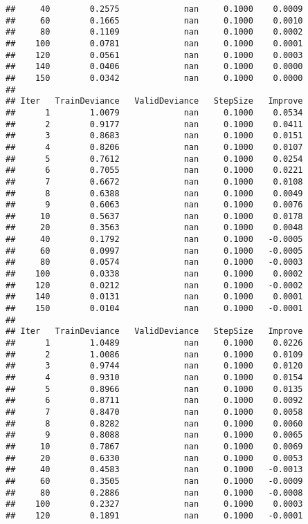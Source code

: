 \documentclass[]{article}
\begin{document}
\begin{verbatim}
##     40        0.2575             nan     0.1000    0.0009
##     60        0.1665             nan     0.1000    0.0010
##     80        0.1109             nan     0.1000    0.0002
##    100        0.0781             nan     0.1000    0.0001
##    120        0.0561             nan     0.1000    0.0003
##    140        0.0406             nan     0.1000    0.0000
##    150        0.0342             nan     0.1000    0.0000
## 
## Iter   TrainDeviance   ValidDeviance   StepSize   Improve
##      1        1.0079             nan     0.1000    0.0534
##      2        0.9177             nan     0.1000    0.0411
##      3        0.8683             nan     0.1000    0.0151
##      4        0.8206             nan     0.1000    0.0107
##      5        0.7612             nan     0.1000    0.0254
##      6        0.7055             nan     0.1000    0.0221
##      7        0.6672             nan     0.1000    0.0108
##      8        0.6388             nan     0.1000    0.0049
##      9        0.6063             nan     0.1000    0.0076
##     10        0.5637             nan     0.1000    0.0178
##     20        0.3563             nan     0.1000    0.0048
##     40        0.1792             nan     0.1000   -0.0005
##     60        0.0997             nan     0.1000   -0.0005
##     80        0.0574             nan     0.1000   -0.0003
##    100        0.0338             nan     0.1000    0.0002
##    120        0.0212             nan     0.1000   -0.0002
##    140        0.0131             nan     0.1000    0.0001
##    150        0.0104             nan     0.1000   -0.0001
## 
## Iter   TrainDeviance   ValidDeviance   StepSize   Improve
##      1        1.0489             nan     0.1000    0.0226
##      2        1.0086             nan     0.1000    0.0109
##      3        0.9744             nan     0.1000    0.0120
##      4        0.9310             nan     0.1000    0.0154
##      5        0.8966             nan     0.1000    0.0135
##      6        0.8711             nan     0.1000    0.0092
##      7        0.8470             nan     0.1000    0.0058
##      8        0.8282             nan     0.1000    0.0060
##      9        0.8088             nan     0.1000    0.0065
##     10        0.7867             nan     0.1000    0.0069
##     20        0.6330             nan     0.1000    0.0053
##     40        0.4583             nan     0.1000   -0.0013
##     60        0.3505             nan     0.1000   -0.0009
##     80        0.2886             nan     0.1000   -0.0008
##    100        0.2327             nan     0.1000    0.0003
##    120        0.1891             nan     0.1000   -0.0001

\end{verbatim}
\end{document}
